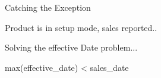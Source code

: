 Catching the Exception

Product is in setup mode, sales reported..

Solving the effective Date problem...

max(effective_date) < sales_date

